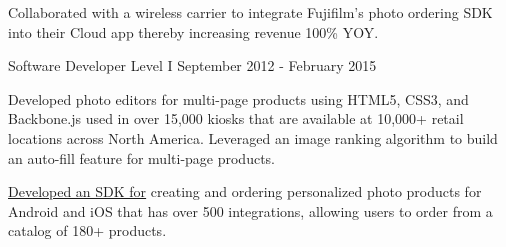 \begin{cventries}
{\begin{cvitems}
        \item {Collaborated with a wireless carrier to integrate Fujifilm’s photo ordering SDK into their Cloud app thereby increasing revenue 100\% YOY.}
      \end{cvitems}
    }

  \cventry
    {Software Developer Level I} %
    { } %
    { } %
    {September 2012 - February 2015} %
    {
      \begin{cvitems} %
      \item{Developed photo editors for multi-page products using HTML5, CSS3, and Backbone.js used in over 15,000 kiosks that are available at 10,000+ retail locations across North America. Leveraged an image ranking algorithm to build an auto-fill feature for multi-page products.}
    \item{\href{https://www.fujifilmapi.com}{Developed an SDK for} creating and ordering personalized photo products for Android and iOS that has over 500 integrations, allowing users to order from a catalog of 180+ products.}
      \end{cvitems}
    }



\end{cventries}
